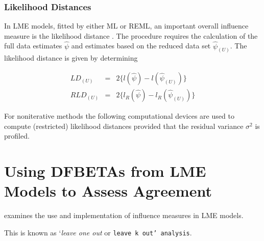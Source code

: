 \documentclass[12pt, a4paper]{report}
\theoremstyle{plain}
\theoremstyle{definition}
\theoremstyle{remark}
\begin{document}
	
	
	
	
	

	
	
	
	\subsubsection{Likelihood Distances}
	
	In LME models, fitted by either ML or REML, an important overall
	influence measure is the likelihood distance \citep{cook82}. The
	procedure requires the calculation of the full data estimates
	$\hat{\psi}$ and estimates based on the reduced data set
	$\hat{\psi}_{(U)}$. The likelihood distance is given by
	determining
	
	
	\begin{eqnarray}
	LD_{(U)} &=& 2\{l(\hat{\psi}) - l( \hat{\psi}_{(U)}) \}\\
	RLD_{(U)} &=& 2\{l_{R}(\hat{\psi}) - l_{R}(\hat{\psi}_{(U)})\}
	\end{eqnarray}
	
	
	
	
	For noniterative methods the following computational devices are used to compute (restricted) likelihood distances provided that the residual variance
	$\sigma^2$ is profiled.
	
	
	
	


	\section{Using DFBETAs from LME Models to Assess Agreement}
	
	
	\citet{schabenberger} examines the use and implementation of influence measures in LME models.

	
	
	
	This is known as `\textit{leave one out} or \texttt{leave k
		out' analysis}.
	
	
	
	
	
\end{document}
